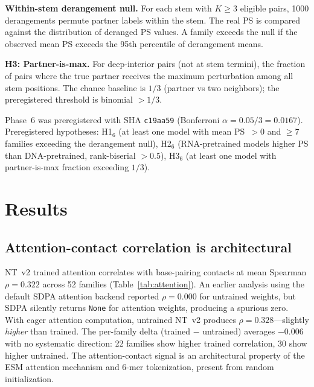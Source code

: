 \documentclass[11pt]{article}
\begin{document}
\textbf{Within-stem derangement null.}  For each stem with
$K \geq 3$ eligible pairs, 1000 derangements permute partner labels
within the stem.  The real PS is compared against the distribution of
deranged PS values.  A family exceeds the null if the observed mean PS
exceeds the 95th percentile of derangement means.

\textbf{H3: Partner-is-max.}  For deep-interior pairs (not at stem
termini), the fraction of pairs where the true partner receives the
maximum perturbation among all stem positions.  The chance baseline is
$1/3$ (partner vs two neighbors); the preregistered threshold is
binomial $> 1/3$.

Phase~6 was preregistered with SHA \texttt{c19aa59} (Bonferroni
$\alpha = 0.05/3 = 0.0167$).  Preregistered hypotheses: H1$_6$
(at least one model with mean PS~$> 0$ and $\geq 7$ families exceeding
the derangement null), H2$_6$ (RNA-pretrained models higher PS than
DNA-pretrained, rank-biserial $> 0.5$), H3$_6$ (at least one model
with partner-is-max fraction exceeding $1/3$).


\section{Results}
\label{sec:results}

\subsection{Attention-contact correlation is architectural}
\label{sec:attn_results}

NT~v2 trained attention correlates with base-pairing contacts at mean
Spearman $\rho = 0.322$ across 52 families
(Table~\ref{tab:attention}).  An earlier analysis using the default
SDPA attention backend reported $\rho = 0.000$ for untrained weights,
but SDPA silently returns \texttt{None} for attention weights,
producing a spurious zero.  With eager attention computation,
untrained NT~v2 produces $\rho = 0.328$---slightly \emph{higher} than
trained.  The per-family delta (trained $-$ untrained) averages
$-0.006$ with no systematic direction: 22 families show higher trained
correlation, 30 show higher untrained.  The attention-contact signal
is an architectural property of the ESM attention mechanism and
6-mer tokenization, present from random initialization.
\end{document}
